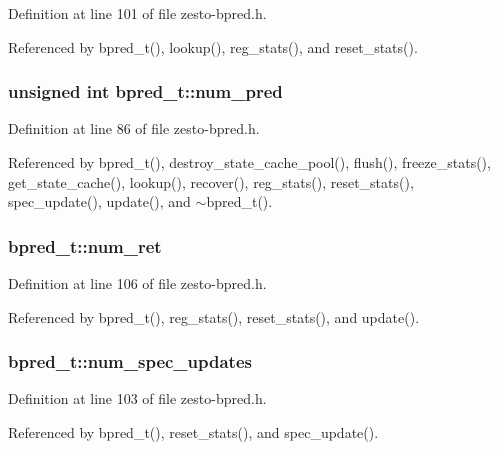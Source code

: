 Definition at line 101 of file zesto-bpred.h.

Referenced by bpred\_\-t(), lookup(), reg\_\-stats(), and reset\_\-stats().
\subsubsection[{num\_\-pred}]{\setlength{\rightskip}{0pt plus 5cm}unsigned int {\bf bpred\_\-t::num\_\-pred}\hspace{0.3cm}{\tt  [protected]}}\label{classbpred__t_c8e6b65af23e18f5de1b3ad465bf5c69}




Definition at line 86 of file zesto-bpred.h.

Referenced by bpred\_\-t(), destroy\_\-state\_\-cache\_\-pool(), flush(), freeze\_\-stats(), get\_\-state\_\-cache(), lookup(), recover(), reg\_\-stats(), reset\_\-stats(), spec\_\-update(), update(), and $\sim$bpred\_\-t().
\subsubsection[{num\_\-ret}]{ {\bf bpred\_\-t::num\_\-ret}\hspace{0.3cm}{\tt  [protected]}}\label{classbpred__t_bd80009e12bcbe934967ae1b1d166ae4}




Definition at line 106 of file zesto-bpred.h.

Referenced by bpred\_\-t(), reg\_\-stats(), reset\_\-stats(), and update().
\subsubsection[{num\_\-spec\_\-updates}]{ {\bf bpred\_\-t::num\_\-spec\_\-updates}\hspace{0.3cm}{\tt  [protected]}}\label{classbpred__t_2106c58e9dd647314e5ec90ae70c46f6}




Definition at line 103 of file zesto-bpred.h.

Referenced by bpred\_\-t(), reset\_\-stats(), and spec\_\-update().
